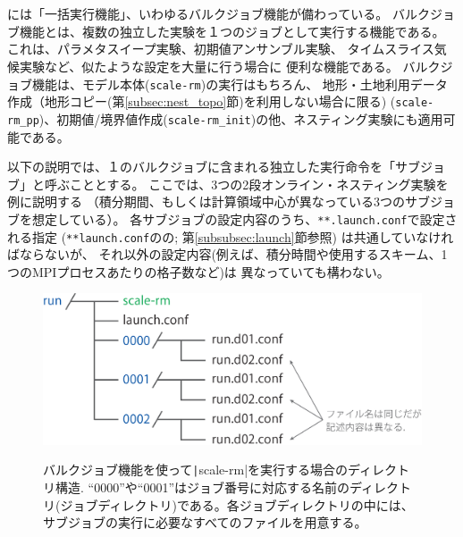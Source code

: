 \section{\SecAdvanceBulkjob} \label{sec:bulkjob}

\scalerm には「一括実行機能」、いわゆるバルクジョブ機能が備わっている。
バルクジョブ機能とは、複数の独立した実験を１つのジョブとして実行する機能である。
これは、パラメタスイープ実験、初期値アンサンブル実験、
タイムスライス気候実験など、似たような設定を大量に行う場合に
便利な機能である。
バルクジョブ機能は、モデル本体(\verb|scale-rm|)の実行はもちろん、
地形・土地利用データ作成（地形コピー(第\ref{subsec:nest_topo}節)を利用しない場合に限る) (\verb|scale-rm_pp|)、初期値/境界値作成(\verb|scale-rm_init|)の他、ネスティング実験にも適用可能である。

以下の説明では、１のバルクジョブに含まれる独立した実行命令を「サブジョブ」と呼ぶこととする。
ここでは、3つの2段オンライン・ネスティング実験を例に説明する
（積分期間、もしくは計算領域中心が異なっている3つのサブジョブを想定している）。
%
各サブジョブの設定内容のうち、\verb|**.launch.conf|で設定される指定
(\verb|**launch.conf|のの;
第\ref{subsubsec:launch}節参照) は共通していなければならないが、
それ以外の設定内容(例えば、積分時間や使用するスキーム、1つのMPIプロセスあたりの格子数など)は
異なっていても構わない。


\begin{figure}[t]
\begin{center}
  \includegraphics[width=0.6\hsize]{./figure/bulkjob_directory_structure.eps}\\
  \caption{バルクジョブ機能を使って\texttt|scale-rm|を実行する場合のディレクトリ構造. ``0000''や``0001''はジョブ番号に対応する名前のディレクトリ(ジョブディレクトリ)である。各ジョブディレクトリの中には、サブジョブの実行に必要なすべてのファイルを用意する。}
  \label{fig_bulkjob}
\end{center}
\end{figure}


